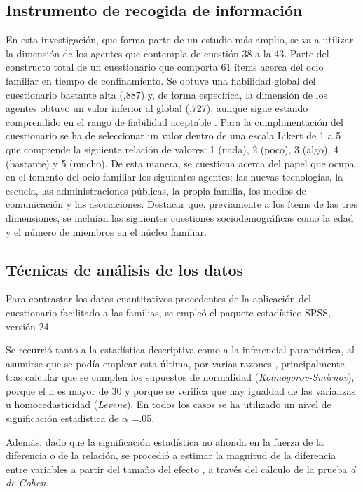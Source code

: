 \documentclass{textolivre}
\begin{document}
\subsection{Instrumento de recogida de información}
En esta investigación, que forma parte de un estudio más amplio, se va a utilizar la dimensión de los agentes que contempla de cuestión 38 a la 43. Parte del constructo total de un cuestionario que comporta 61 ítems acerca del ocio familiar en tiempo de confinamiento. Se obtuve una fiabilidad global del cuestionario bastante alta (,887) y, de forma específica, la dimensión de los agentes obtuvo un valor inferior al global (,727), aunque sigue estando comprendido en el rango de fiabilidad aceptable \cite{celina2005}. Para la cumplimentación del cuestionario se ha de seleccionar un valor dentro de una escala Likert de 1 a 5 que comprende la siguiente relación de valores: 1 (nada), 2 (poco), 3 (algo), 4 (bastante) y 5 (mucho). De esta manera, se cuestiona acerca del papel que ocupa en el fomento del ocio familiar los siguientes agentes: las nuevas tecnologías, la escuela, las administraciones públicas, la propia familia, los medios de comunicación y las asociaciones. Destacar que, previamente a los ítems de las tres dimensiones, se incluían las siguientes cuestiones sociodemográficas como la edad y el número de miembros en el núcleo familiar. 

\subsection{Técnicas de análisis de los datos}
Para contrastar los datos cuantitativos procedentes de la aplicación del cuestionario facilitado a las familias, se empleó el paquete estadístico SPSS, versión 24. 

Se recurrió tanto a la estadística descriptiva como a la inferencial paramétrica, al asumirse que se podía emplear esta última, por varias razones \cite{siegel1991}, principalmente tras calcular que se cumplen los supuestos de normalidad (\emph{Kolmogorov-Smirnov}), porque el n es mayor de 30 y porque se verifica que hay igualdad de las varianzas u homocedasticidad (\emph{Levene}). En todos los casos se ha utilizado un nivel de significación estadística de $\alpha$ =.05. 

Además, dado que la significación estadística no ahonda en la fuerza de la diferencia o de la relación, se procedió a estimar la magnitud de la diferencia entre variables a partir del tamaño del efecto \cite{cohen1988}, a través del cálculo de la prueba \emph{d de Cohen}.
\end{document}
